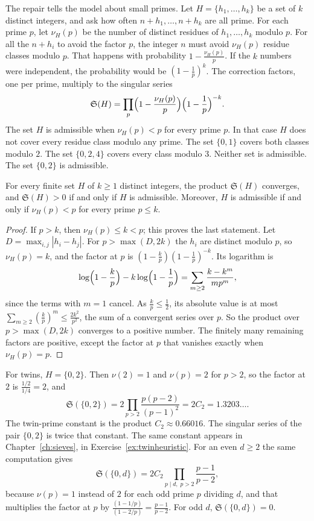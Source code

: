The repair tells the model about small primes. Let $H=\{h_1,\dots,h_k\}$ be a set of $k$ distinct integers, and ask how often $n+h_1,\dots,n+h_k$ are all prime. For each prime $p$, let $\nu_H(p)$ be the number of distinct residues of $h_1,\dots,h_k$ modulo $p$. For all the $n+h_i$ to avoid the factor $p$, the integer $n$ must avoid $\nu_H(p)$ residue classes modulo $p$. That happens with probability $1-\frac{\nu_H(p)}p$. If the $k$ numbers were independent, the probability would be $(1-\frac1p)^k$. The correction factors, one per prime, multiply to the singular series
\[
\mathfrak S(H)=\prod_p\Bigl(1-\frac{\nu_H(p)}p\Bigr)\Bigl(1-\frac1p\Bigr)^{-k}.
\]
The set $H$ is admissible when $\nu_H(p)<p$ for every prime $p$. In that case $H$ does not cover every residue class modulo any prime. The set $\{0,1\}$ covers both classes modulo $2$. The set $\{0,2,4\}$ covers every class modulo $3$. Neither set is admissible. The set $\{0,2\}$ is admissible.

\begin{proposition}\label{prop:ssconv}
For every finite set $H$ of $k\ge1$ distinct integers, the product $\mathfrak S(H)$ converges, and $\mathfrak S(H)>0$ if and only if $H$ is admissible. Moreover, $H$ is admissible if and only if $\nu_H(p)<p$
for every prime $p\le k$.
\end{proposition}

\begin{proof}
If $p>k$, then $\nu_H(p)\le k<p$; this proves the last statement. Let $D=\max_{i,j}|h_i-h_j|$. For $p>\max(D,2k)$ the $h_i$ are distinct modulo $p$, so $\nu_H(p)=k$, and the factor at $p$ is
$(1-\frac kp)(1-\frac1p)^{-k}$. Its logarithm is
\[
\log\Bigl(1-\frac kp\Bigr)-k\log\Bigl(1-\frac1p\Bigr)=\sum_{m\ge2}\frac{k-k^m}{mp^m},
\]
since the terms with $m=1$ cancel. As $\frac kp\le\frac12$, its absolute value is at most $\sum_{m\ge2}(\frac kp)^m\le\frac{2k^2}{p^2}$, the sum of a convergent series over $p$. So the product over
$p>\max(D,2k)$ converges to a positive number. The finitely many remaining factors are positive, except the factor at $p$ that vanishes exactly when $\nu_H(p)=p$.
\end{proof}

For twins, $H=\{0,2\}$. Then $\nu(2)=1$ and $\nu(p)=2$ for $p>2$, so the factor at $2$ is $\frac{1/2}{1/4}=2$, and
\[
\mathfrak S(\{0,2\})=2\prod_{p>2}\frac{p(p-2)}{(p-1)^2}=2C_2=1.3203\ldots.
\]
The twin-prime constant is the product $C_2\approx0.66016$. The singular series of the pair $\{0,2\}$ is twice that constant. The same constant appears in Chapter~\ref{ch:sieves}, in Exercise~\ref{ex:twinheuristic}. For an even $d\ge2$ the same computation gives
\[
\mathfrak S(\{0,d\})=2C_2\prod_{p\mid d,\;p>2}\frac{p-1}{p-2},
\]
because $\nu(p)=1$ instead of $2$ for each odd prime $p$ dividing $d$, and that multiplies the factor at $p$ by $\frac{(1-1/p)}{(1-2/p)}=\frac{p-1}{p-2}$. For odd $d$, $\mathfrak S(\{0,d\})=0$.

